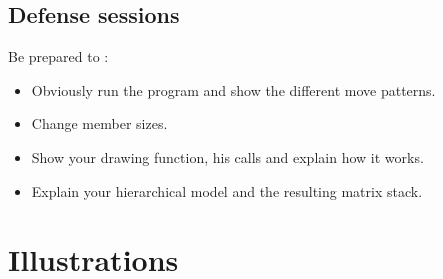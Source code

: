 \documentclass{42}
\begin{document}
\section{Defense sessions}

Be prepared to :\\
\begin{itemize}
	\item Obviously run the program and show the different move patterns.
	\item Change member sizes.
	\item Show your drawing function, his calls and explain how it works.
	\item Explain your hierarchical model and the resulting matrix stack.
\end{itemize}

\chapter{Illustrations}

\end{document}

